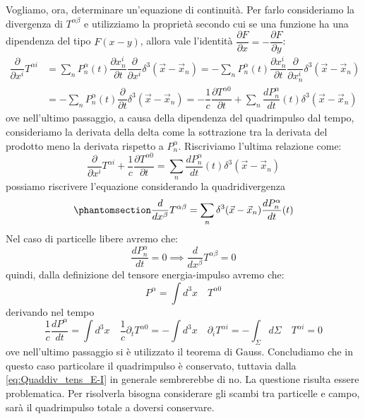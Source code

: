 Vogliamo, ora, determinare un'equazione di continuità. Per farlo consideriamo la divergenza di $T^{\alpha \beta}$ e utilizziamo la proprietà secondo cui se una funzione ha una dipendenza del tipo $F(x-y)$, allora vale l'identità $\dfrac{\partial F}{\partial x}=-\dfrac{\partial F}{\partial y}$:
  \begin{equation}
  \begin{aligned}
      \dfrac{\partial}{\partial x^i}T^{\alpha i}&=\sum_nP^\alpha_n(t)\dfrac{\partial x^i_n}{\partial t} \dfrac{\partial }{\partial x^i}\delta^3(\Vec{x}-\Vec{x}_n)=-\sum_nP^\alpha_n(t)\dfrac{\partial x^i_n}{\partial t} \dfrac{\partial}{\partial x^i_n}\delta^3(\Vec{x}-\Vec{x}_n)\\
      &=-\sum_nP^\alpha_n(t)\dfrac{\partial }{\partial t} \delta^3(\Vec{x}-\Vec{x}_n)=-\dfrac{1}{c}\dfrac{\partial T^{\alpha 0}}{\partial t}+\sum_n\dfrac{dP^\alpha_n}{dt}(t)\delta^3(\Vec{x}-\Vec{x}_n)
  \end{aligned}
\end{equation}
ove nell'ultimo passaggio, a causa della dipendenza del quadrimpulso dal tempo, consideriamo la derivata della delta come la sottrazione tra la derivata del prodotto meno la derivata rispetto a $P^\alpha_n$.
Riscriviamo l'ultima relazione come:
 \begin{equation}
 \dfrac{\partial}{\partial x^i}T^{\alpha i}+\dfrac{1}{c}\dfrac{\partial T^{\alpha 0}}{\partial t}=\sum_n\dfrac{dP^\alpha_n}{dt}(t)\delta^3(\Vec{x}-\Vec{x}_n)
\end{equation}
possiamo riscrivere l'equazione considerando la quadridivergenza
\begin{equation}\phantomsection\label{eq:Quaddiv_tens_E-I}
 \dfrac{d}{dx^\beta}T^{\alpha \beta}=\sum_n\delta^3(\Vec{x}-\Vec{x}_n)\dfrac{dP^\alpha_n}{dt}(t)
\end{equation}
Nel caso di particelle libere avremo che:
\begin{equation}
    \dfrac{dP^\alpha_n}{dt}=0 \implies\dfrac{d}{dx^\beta}T^{\alpha \beta}=0
\end{equation}
quindi, dalla definizione del tensore energia-impulso avremo che:
\begin{equation}
    P^\alpha=\int d^3x \quad T^{\alpha0}
\end{equation}
derivando nel tempo
\begin{equation}
 \dfrac{1}{c}  \dfrac{dP^\alpha}{dt}=\int d^3x\quad \dfrac{1}{c} \partial_t T^{\alpha0}=-\int d^3x \quad\partial_i T^{\alpha i}=-\int_\Sigma d\Sigma\quad T^{\alpha i}=0
\end{equation}
ove nell'ultimo passaggio si è utilizzato il teorema di Gauss. Concludiamo che in questo caso particolare il quadrimpulso è conservato, tuttavia dalla \eqref{eq:Quaddiv_tens_E-I} in generale sembrerebbe di no. La questione risulta essere problematica. Per  risolverla bisogna considerare gli scambi tra particelle e campo, sarà il quadrimpulso totale a doversi conservare.
